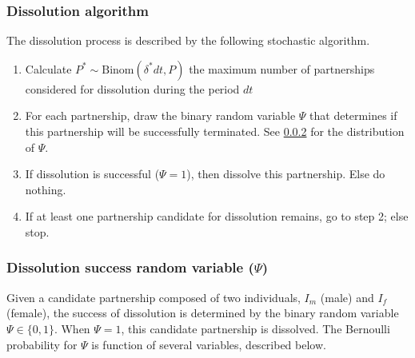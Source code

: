 \documentclass[11pt, onecolumn]{article}
\begin{document}
\subsubsection{Dissolution algorithm}
The dissolution process is described by the following stochastic algorithm.

\begin{enumerate}
\item Calculate $P^* \sim \text{Binom}(\delta^*dt, P)$ the maximum number of partnerships considered for dissolution during the period $dt$

\item For each partnership, draw the binary random variable $\Psi$ that determines if this partnership will be successfully terminated. See \ref{dissolutionSuccessFormula} for the distribution of $\Psi$.

\item If dissolution is successful ($\Psi=1$), then dissolve this partnership. Else do nothing.

\item If at least one partnership candidate for dissolution remains, go to step 2; else stop.

\end{enumerate}

\subsubsection{Dissolution success random variable ($\Psi$)}
\label{dissolutionSuccessFormula}

Given a candidate partnership composed of two individuals, $I_m$ (male) and $I_f$ (female), the success of dissolution is determined by the binary random variable $\Psi\in\{0,1\}$. When $\Psi=1$, this candidate partnership is dissolved. The Bernoulli probability for $\Psi$ is function of several variables, described below.
\end{document}
